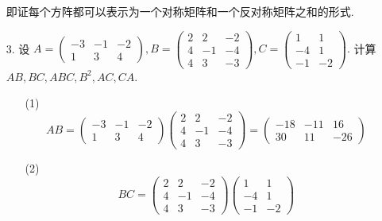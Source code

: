 \documentclass{article}
\begin{document}
\begin{enumerate}
        即证每个方阵都可以表示为一个对称矩阵和一个反对称矩阵之和的形式.
        \item [3.]设
        $A=\begin{pmatrix}
            -3& -1& -2\\
            1& 3& 4 
        \end{pmatrix},
        B=\begin{pmatrix}
            2& 2& -2\\
            4& -1& -4\\
            4& 3& -3
        \end{pmatrix},
        C=\begin{pmatrix}
            1& 1\\
            -4& 1\\
            -1& -2
        \end{pmatrix}.
        $
        计算$AB,BC,ABC,B^2,AC,CA$.
        \begin{enumerate}
            \item [(1)]
            \[
                AB=
                \begin{pmatrix}
                    -3& -1& -2\\
                    1& 3& 4
                \end{pmatrix}
                \begin{pmatrix}
                    2& 2& -2\\
                    4& -1& -4\\
                    4& 3& -3
                \end{pmatrix}
                =
                \begin{pmatrix}
                    -18& -11& 16\\
                    30& 11& -26
                \end{pmatrix}
            \]
            \item [(2)]
            \[
                BC=
                \begin{pmatrix}
                    2& 2& -2\\
                    4& -1& -4\\
                    4& 3& -3
                \end{pmatrix}
                \begin{pmatrix}
                    1& 1\\
                    -4& 1\\
                    -1& -2
                \end{pmatrix}
\]
\end{enumerate}
\end{enumerate}
\end{document}
